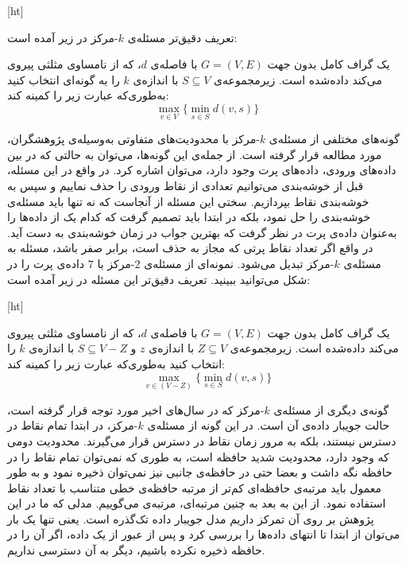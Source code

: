 [ht]


تعریف دقیق‌تر مسئله‌ی $k$-مرکز در زیر آمده است:

 یک گراف کامل بدون جهت $G = (V, E)$ با فاصله‌ی $d$، که از نامساوی مثلثی پیروی می‌کند داده‌شده است. زیرمجموعه‌ی $S \subseteq V$ با اندازه‌ی $k$ را به گونه‌ای انتخاب کنید به‌طوری‌که عبارت زیر را کمینه کند:
$$\max_{v \in V} \{ \min_{s \in S} d(v, s) \}$$

گونه‌های مختلفی از مسئله‌ی $k$-مرکز با محدودیت‌های متفاوتی به‌وسیله‌ی پژوهشگران، مورد مطالعه قرار گرفته است. از جمله‌ی این گونه‌ها، می‌توان به حالتی که در بین داده‌های ورودی، داده‌های پرت وجود دارد، می‌توان اشاره کرد. در واقع در این مسئله، قبل از خوشه‌بندی می‌توانیم تعدادی از نقاط ورودی را حذف نماییم و سپس به خوشه‌بندی نقاط بپردازیم. سختی این مسئله از آنجاست که نه تنها باید مسئله‌ی خوشه‌بندی را حل نمود، بلکه در ابتدا باید تصمیم گرفت که کدام یک از داده‌ها را به‌عنوان داده‌ی پرت در نظر گرفت که بهترین جواب در زمان خوشه‌بندی به دست آید. در واقع اگر تعداد نقاط پرتی که مجاز‌ به حذف است، برابر صفر باشد، مسئله به مسئله‌ی $k$-مرکز تبدیل می‌شود. نمونه‌ای از مسئله‌ی $2$-مرکز با $7$ داده‌ی پرت را در شکل  می‌توانید ببینید. تعریف دقیق‌تر این مسئله در زیر آمده است:

[ht]


 یک گراف کامل بدون جهت $G = (V, E)$ با فاصله‌ی $d$، که از نامساوی مثلثی پیروی می‌کند داده‌شده است. زیرمجموعه‌ی $Z \subseteq V$ با اندازه‌ی $z$ و $S \subseteq V - Z$ با اندازه‌ی $k$ را انتخاب کنید به‌طوری‌که عبارت زیر را کمینه کند:
$$\max_{v \in (V - Z)} \{ \min_{s \in S} d(v, s) \}$$

گونه‌ی دیگری از‌ مسئله‌ی $k$-مرکز که در سال‌های اخیر مورد توجه قرار گرفته است، حالت جویبار داده‌ی آن است. در این گونه از مسئله‌ی $k$-مرکز، در ابتدا تمام نقاط در دسترس نیستند، بلکه به مرور زمان نقاط در دسترس قرار می‌گیرند. محدودیت دومی که وجود دارد، محدودیت شدید حافظه است، به طوری که نمی‌توان تمام نقاط را در حافظه نگه داشت و بعضا حتی در حافظه‌ی جانبی نیز نمی‌توان ذخیره نمود و به طور معمول باید مرتبه‌ی حافظه‌ای کم‌تر از مرتبه حافظه‌ی خطی متناسب با تعداد نقاط استفاده نمود. از این به بعد به چنین مرتبه‌ای، مرتبه‌ی  می‌گوییم. مدلی که ما در این پژوهش بر روی آن تمرکز داریم مدل جویبار داده تک‌گذره  است. یعنی تنها یک بار می‌توان از ابتدا تا انتهای داده‌ها را بررسی کرد و پس از عبور از‌ یک داده، اگر آن‌ را در حافظه ذخیره نکرده باشیم، دیگر به آن دسترسی نداریم.

